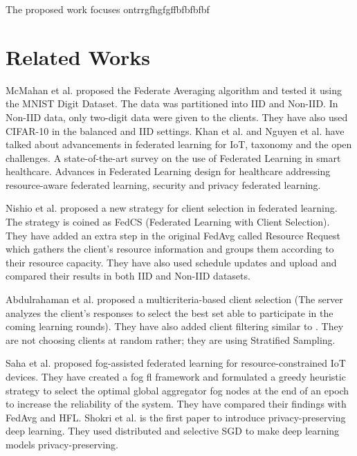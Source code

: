 \documentclass[conference]{IEEEtran}
\begin{document}
 The proposed work focuses ontrrgfhgfgffbfbfbfbf



\section{Related Works}
McMahan et al. \cite{mcmahan2017communication} proposed the Federate Averaging algorithm and tested it using the MNIST Digit Dataset. The data was partitioned into IID and Non-IID. In Non-IID data, only two-digit data were given to the clients. They have also used CIFAR-10 in the balanced and IID settings. 
Khan et al. \cite{khan2021federated} and Nguyen et al. \cite{nguyen2021federated} have talked about advancements in federated learning for IoT, taxonomy and the open challenges. A state-of-the-art survey on the use of Federated Learning in smart healthcare. Advances in Federated Learning design for healthcare addressing resource-aware federated learning, security and privacy federated learning. \par
Nishio et al. \cite{nishio2019client} proposed a new strategy for client selection in federated learning. The strategy is coined as FedCS (Federated Learning with Client Selection). They have added an extra step in the original FedAvg called Resource Request which gathers the client's resource information and groups them according to their resource capacity. They have also used schedule updates and upload and compared their results in both IID and Non-IID datasets.
\par
Abdulrahaman et al. \cite{abdulrahman2020fedmccs} proposed a multicriteria-based client selection (The server analyzes the client's responses to select the best set able to participate in the coming learning rounds). They have also added client filtering similar to \cite{nishio2019client}. They are not choosing clients at random rather; they are using Stratified Sampling.
\par
Saha et al. \cite{saha2020fogfl} proposed fog-assisted federated learning for resource-constrained IoT devices. They have created a fog fl framework and formulated a greedy heuristic strategy to select the optimal global aggregator fog nodes at the end of an epoch to increase the reliability of the system. They have compared their findings with FedAvg and HFL.
Shokri et al. \cite{shokri2015privacy} is the first paper to introduce privacy-preserving deep learning. They used distributed and selective SGD to make deep learning models privacy-preserving. \par
\end{document}

